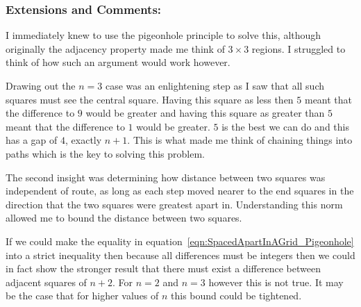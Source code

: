 \subsubsection{Extensions and Comments:}

I immediately knew to use the pigeonhole principle to solve this, although originally the adjacency property made me think of $3 \times 3$ regions. I struggled to think of how such an argument would work however.

Drawing out the $n = 3$ case was an enlightening step as I saw that all such squares must see the central square. Having this square as less then $5$ meant that the difference to $9$ would be greater and having this square as greater than $5$ meant that the difference to $1$ would be greater. $5$ is the best we can do and this has a gap of $4$, exactly $n + 1$. This is what made me think of chaining things into paths which is the key to solving this problem.

The second insight was determining how distance between two squares was independent of route, as long as each step moved nearer to the end squares in the direction that the two squares were greatest apart in. Understanding this norm allowed me to bound the distance between two squares.

If we could make the equality in equation~\ref{eqn:SpacedApartInAGrid_Pigeonhole} into a strict inequality then because all differences must be integers then we could in fact show the stronger result that there must exist a difference between adjacent squares of $n + 2$. For $n = 2$ and $n = 3$ however this is not true. It may be the case that for higher values of $n$ this bound could be tightened.